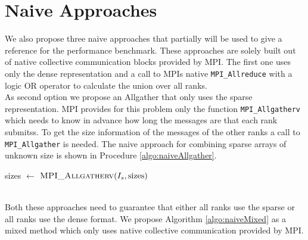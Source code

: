 \section{Naive Approaches} \label{sec:NaiveApproaches}
We also propose three naive approaches that partially will be used to give a reference for the performance benchmark. These approaches are solely built out of native collective communication blocks provided by MPI. The first one uses only the dense representation and a call to MPIs native \texttt{MPI\_Allreduce} with a logic OR operator to calculate the union over all ranks.\\
As second option we propose an Allgather that only uses the sparse representation. MPI provides for this problem only the function \texttt{MPI\_Allgatherv} which needs to know in advance how long the messages are that each rank submitss. To get the size information of the messages of the other ranks a call to \texttt{MPI\_Allgather} is needed. The naive approach for combining sparse arrays of unknown size is shown in Procedure \ref{algo:naiveAllgather}. 
\begin{algorithm}[h]
	\caption{Implementation of the naive Allgather set union.\\
	$I_s$: input array with sparse representation of $S_r$\\
	$sparseSize$: length of sparse list} \label{algo:naiveAllgather}
	\begin{algorithmic}[1]
			\State sizes $\gets$ 
			\State $\Call{MPI\_Allgatherv}{I_s, \text{sizes}}$
		\EndProcedure
	\end{algorithmic}
\end{algorithm}
\\Both these approaches need to guarantee that either all ranks use the sparse or all ranks use the dense format. We propose Algorithm \ref{algo:naiveMixed} as a mixed method which only uses native collective communication provided by MPI. 
